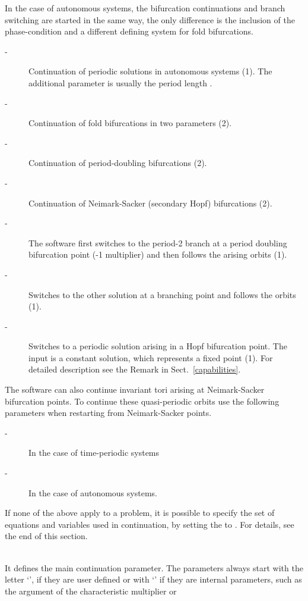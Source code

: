 \documentclass[10pt,a4paper]{ddedoc}
\begin{document}
\begin{description}
\begin{description}
\end{description}
In the case of autonomous systems, the bifurcation continuations and branch switching are started in the same way, the only difference is the inclusion of the phase-condition and a different defining system for fold bifurcations.
\begin{description}
\item[ -] Continuation of periodic solutions in autonomous systems (1). The additional parameter is usually the period length .
%
\item[ -] Continuation of fold bifurcations in two parameters (2).
%
\item[ -] Continuation of period-doubling bifurcations (2).
%
\item[ -] Continuation of Neimark-Sacker (secondary Hopf) bifurcations (2).
%
\item[ -] The software first switches to the period-2 branch at a period doubling bifurcation point
(-1 multiplier) and then follows the arising orbits (1).
%
\item[ -] Switches to the other solution at a branching point and follows the orbits (1).
%
\item[ -] Switches to a periodic solution arising in a Hopf bifurcation point. The input is a constant solution, which represents a fixed point (1). For detailed description see the Remark in Sect.\ \ref{capabilities}.
\end{description}
The software can also continue invariant tori arising at Neimark-Sacker bifurcation points. To continue these quasi-periodic orbits use the following parameters when restarting from Neimark-Sacker points.
\begin{description}
\item[ -] In the case of time-periodic systems
%
\item[ -] In the case of autonomous systems.
\end{description}
If none of the above apply to a problem, it is possible to specify the set of equations and variables used in continuation, by setting the  to . For details, see the end of this section.
%
\item[\funp{CP}] ~\\
It defines the main continuation parameter. The parameters always start with the letter `', if they are user defined or with `' if they are internal parameters, such as the argument of the characteristic multiplier or

\end{description}
\end{document}
